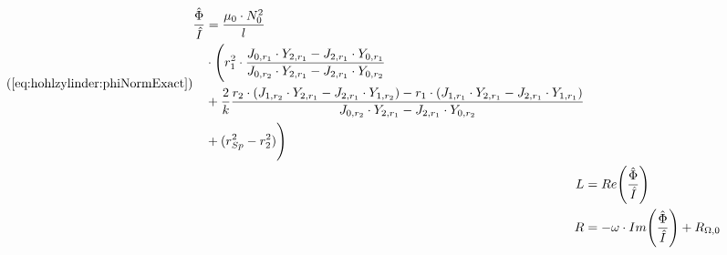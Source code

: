 \begin{align*}
    \tag{\ref{eq:hohlzylinder:phiNormExact}}
    \begin{split}
    \frac{\hat{\Phi}}{\hat{I}} & = \frac{\mu_0 \cdot N_0^2}{l} \\
                               & \cdot \Biggl( r_1^2 \cdot \frac{J_{0,r_1} \cdot Y_{2,r_1} - J_{2,r_1} \cdot Y_{0,r_1}}{J_{0,r_2} \cdot Y_{2,r_1} - J_{2,r_1} \cdot Y_{0,r_2}} \\
                               & + \frac{2}{k} \frac{r_2 \cdot (J_{1,r_2} \cdot Y_{2,r_1} - J_{2,r_1} \cdot Y_{1,r_2}) - r_1 \cdot (J_{1,r_1} \cdot Y_{2,r_1} - J_{2,r_1} \cdot Y_{1,r_1})}{J_{0,r_2} \cdot Y_{2,r_1} - J_{2,r_1} \cdot Y_{0,r_2}} \\
                               & + (r_{Sp}^2 - r_2^2) \Biggr)
    \end{split} \\
    L & = Re \Biggl(\frac{\hat{\Phi}}{\hat{I}} \Biggr) \\
    R & = - \omega \cdot Im \Biggl(\frac{\hat{\Phi}}{\hat{I}} \Biggr) + R_{\Omega,0}
\end{align*}

\begin{figure}[h!]
    \resizebox{\textwidth}{!}{}
\end{figure}

\begin{figure}[h!]
    \resizebox{\textwidth}{!}{}
\end{figure}

\begin{figure}[h!]
    \resizebox{\textwidth}{!}{}
\end{figure}

